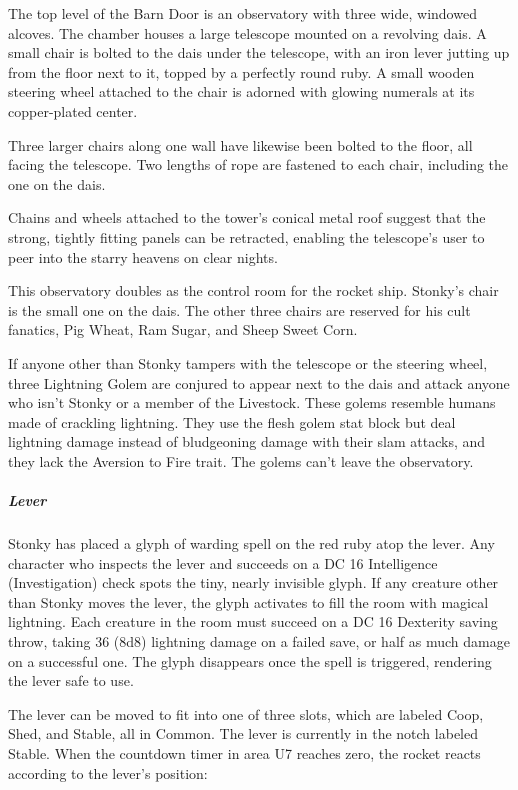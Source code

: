 \documentclass[10pt,a4paper,twoside,bg=print,twocolumn,openany,nodeprecatedcode]{dndbook}
\begin{document}
\begin{DndReadAloud}{}
The top level of the Barn Door is an observatory with three wide, windowed alcoves. The chamber houses a large telescope mounted on a revolving dais. A small chair is bolted to the dais under the telescope, with an iron lever jutting up from the floor next to it, topped by a perfectly round ruby. A small wooden steering wheel attached to the chair is adorned with glowing numerals at its copper-plated center.

Three larger chairs along one wall have likewise been bolted to the floor, all facing the telescope. Two lengths of rope are fastened to each chair, including the one on the dais.

Chains and wheels attached to the tower's conical metal roof suggest that the strong, tightly fitting panels can be retracted, enabling the telescope's user to peer into the starry heavens on clear nights.

\end{DndReadAloud}

This observatory doubles as the control room for the rocket ship. Stonky's chair is the small one on the dais. The other three chairs are reserved for his cult fanatics, Pig Wheat, Ram Sugar, and Sheep Sweet Corn.

If anyone other than Stonky tampers with the telescope or the steering wheel, three Lightning Golem are conjured to appear next to the dais and attack anyone who isn't Stonky or a member of the Livestock. These golems resemble humans made of crackling lightning. They use the flesh golem stat block but deal lightning damage instead of bludgeoning damage with their slam attacks, and they lack the Aversion to Fire trait. The golems can't leave the observatory.

\subparagraph{Lever}
Stonky has placed a glyph of warding spell on the red ruby atop the lever. Any character who inspects the lever and succeeds on a DC 16 Intelligence (Investigation) check spots the tiny, nearly invisible glyph. If any creature other than Stonky moves the lever, the glyph activates to fill the room with magical lightning. Each creature in the room must succeed on a DC 16 Dexterity saving throw, taking 36 (8d8) lightning damage on a failed save, or half as much damage on a successful one. The glyph disappears once the spell is triggered, rendering the lever safe to use.

The lever can be moved to fit into one of three slots, which are labeled Coop, Shed, and Stable, all in Common. The lever is currently in the notch labeled Stable. When the countdown timer in area U7 reaches zero, the rocket reacts according to the lever's position:
\end{document}
